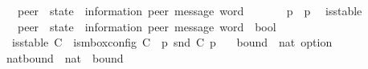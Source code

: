 \begin{isabellebody}
\ \ {\isacharcolon}{\kern0pt}{\isacharcolon}{\kern0pt}\ {\isachardoublequoteopen}{\isacharprime}{\kern0pt}peer\ {\isasymRightarrow}\ {\isacharparenleft}{\kern0pt}{\isacharprime}{\kern0pt}state\ {\isasymtimes}\ {\isacharparenleft}{\kern0pt}{\isacharprime}{\kern0pt}information{\isacharcomma}{\kern0pt}\ {\isacharprime}{\kern0pt}peer{\isacharparenright}{\kern0pt}\ message\ word{\isacharparenright}{\kern0pt}{\isachardoublequoteclose}\ \ {\isacharparenleft}{\kern0pt}{\isachardoublequoteopen}{\isasymC}\isactrlsub {\isasymI}\isactrlsub {\isasymmm}{\isachardoublequoteclose}{\isacharparenright}{\kern0pt}\ \isanewline
\ \ {\isachardoublequoteopen}{\isasymC}\isactrlsub {\isasymI}\isactrlsub {\isasymmm}\ {\isasymequiv}\ {\isasymlambda}p{\isachardot}{\kern0pt}\ {\isacharparenleft}{\kern0pt}{\isasymI}\ p{\isacharcomma}{\kern0pt}\ {\isasymepsilon}{\isacharparenright}{\kern0pt}{\isachardoublequoteclose}\isanewline
\isanewline
{}\isamarkupfalse%
\ is{\isacharunderscore}{\kern0pt}stable\isanewline
\ \ {\isacharcolon}{\kern0pt}{\isacharcolon}{\kern0pt}\ {\isachardoublequoteopen}{\isacharparenleft}{\kern0pt}{\isacharprime}{\kern0pt}peer\ {\isasymRightarrow}\ {\isacharparenleft}{\kern0pt}{\isacharprime}{\kern0pt}state\ {\isasymtimes}\ {\isacharparenleft}{\kern0pt}{\isacharprime}{\kern0pt}information{\isacharcomma}{\kern0pt}\ {\isacharprime}{\kern0pt}peer{\isacharparenright}{\kern0pt}\ message\ word{\isacharparenright}{\kern0pt}{\isacharparenright}{\kern0pt}\ {\isasymRightarrow}\ bool{\isachardoublequoteclose}\ \isanewline
\ \ {\isachardoublequoteopen}is{\isacharunderscore}{\kern0pt}stable\ C\ {\isasymequiv}\ is{\isacharunderscore}{\kern0pt}mbox{\isacharunderscore}{\kern0pt}config\ C\ {\isasymand}\ {\isacharparenleft}{\kern0pt}{\isasymforall}p{\isachardot}{\kern0pt}\ snd\ {\isacharparenleft}{\kern0pt}C\ p{\isacharparenright}{\kern0pt}\ {\isacharequal}{\kern0pt}\ {\isasymepsilon}{\isacharparenright}{\kern0pt}{\isachardoublequoteclose}\isanewline
\isanewline
{}\isamarkupfalse%
\ bound\ {\isacharequal}{\kern0pt}\ {\isachardoublequoteopen}nat\ option{\isachardoublequoteclose}\isanewline
\isanewline
{}\isamarkupfalse%
\ nat{\isacharunderscore}{\kern0pt}bound\ {\isacharcolon}{\kern0pt}{\isacharcolon}{\kern0pt}\ {\isachardoublequoteopen}nat\ {\isasymRightarrow}\ bound{\isachardoublequoteclose}\ \ {\isacharparenleft}{\kern0pt}{\isachardoublequoteopen}{\isasymB}\ {\isacharunderscore}{\kern0pt}{\isachardoublequoteclose}\ {\isacharbrackleft}{\kern0pt}{}{}{\isacharbrackright}{\kern0pt}\ {}{}{}{\isacharparenright}{\kern0pt}\ \isanewline

\end{isabellebody}
